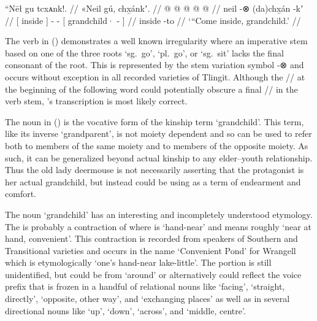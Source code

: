 \ex\label{ex:89-34-come-inside}%
%
\begingl
	\glpreamble	“Nēł gu tcxᴀnk!. //
	\glpreamble	«\!Neil gú, chx̱ánkʼ. //
	\gla	{}  @ {} {}
		 @ {} @ {} @ {}
		{}  @ {} {} //
	\glb	{} neil {} {}
		{} {}  -⊗
		{} (da)chx̱án -kʼ {} //
	\glc	{}[ inside \· {}] 
		\· -  -
		{}[ grandchild· - {}] //
	\gld	{} inside -to {}
		 {} {} {}
		{}  {} {} //
	\glft	‘“Come inside, grandchild.’
		//
\endgl
\xe

The verb  in (\lastx) demonstrates a well known irregularity where an imperative stem based on one of the three roots  ‘sg.\ go’,  ‘pl.\ go’, or  ‘sg.\ sit’ lacks the final consonant of the root.
This is represented by the stem variation symbol -⊗ and occurs without exception in all recorded varieties of Tlingit.
Although the // at the beginning of the following word could potentially obscure a final // in the verb stem, \citeauthor{swanton:1909}’s transcription  is most likely correct.

The noun  in (\lastx) is the vocative form of the kinship term  ‘grandchild’.
This term, like its inverse  ‘grandparent’, is not moiety dependent and so can be used to refer both to members of the same moiety and to members of the opposite moiety.
As such, it can be generalized beyond actual kinship to any elder–youth relationship.
Thus the old lady deermouse is not necessarily asserting that the protagonist is her actual grandchild, but instead could be using  as a term of endearment and comfort.

The noun  ‘grandchild’ has an interesting and incompletely understood etymology.
The  is probably a contraction of  where  is ‘hand-near’ and means roughly ‘near at hand, convenient’.
This contraction is recorded from speakers of Southern and Transitional varieties and occurs in the name  ‘Convenient Pond’ for Wrangell which is etymologically  ‘one’s hand-near lake-little’.
The  portion is still unidentified, but could be from  ‘around’ or alternatively could reflect the  voice prefix that is frozen in a handful of relational nouns like  ‘facing’,  ‘straight, directly’,  ‘opposite, other way’, and  ‘exchanging places’ as well as in several directional nouns like  ‘up’,  ‘down’,  ‘across’, and  ‘middle, centre’.

